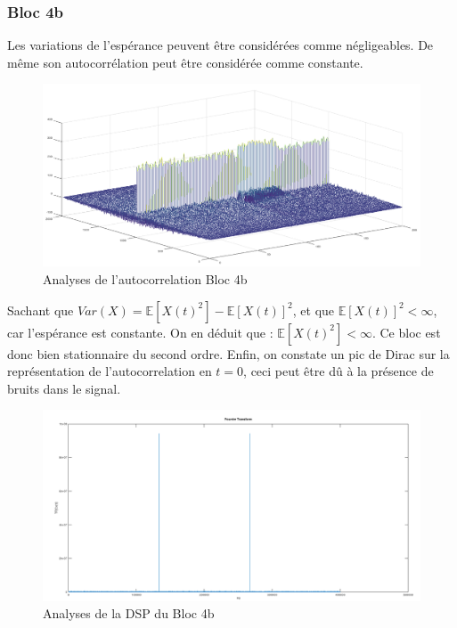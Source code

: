 \documentclass[french, a4paper, 12pt, openany]{book}
\begin{document}
	\subsubsection{Bloc 4b}
	Les variations de l'espérance peuvent être considérées comme négligeables. De même son autocorrélation peut être considérée comme constante.

	\begin{figure}[ht]
		\begin{center}
		\includegraphics[scale=0.25]{images/AutoCorrBloc4-2.png}
		\end{center}
		\caption{Analyses de l'autocorrelation Bloc 4b}
		\label{Analyses de l'autocorrelation Bloc 4b}
	\end{figure}

Sachant que \begin{math}Var(X) = \mathbb{E}[X(t)^2] - \mathbb{E}[X(t)]^2\end{math}, et que \begin{math}\mathbb{E}[X(t)]^2<\infty\end{math}, car l'espérance est constante. On en déduit que : \begin{math}\mathbb{E}[X(t)^2]<\infty\end{math}. Ce bloc est donc bien stationnaire du second ordre.
Enfin, on constate un pic de Dirac sur la représentation de l'autocorrelation en \(t = 0\), ceci peut être dû à la présence de bruits dans le signal.

	\begin{figure}[ht]
		\begin{center}
		\includegraphics[scale=0.25]{images/DSPBloc4-2.png}
		\end{center}
		\caption{Analyses de la DSP du Bloc 4b}
		\label{Analyses de la DSP du Bloc 4b}
	\end{figure}
\end{document}
